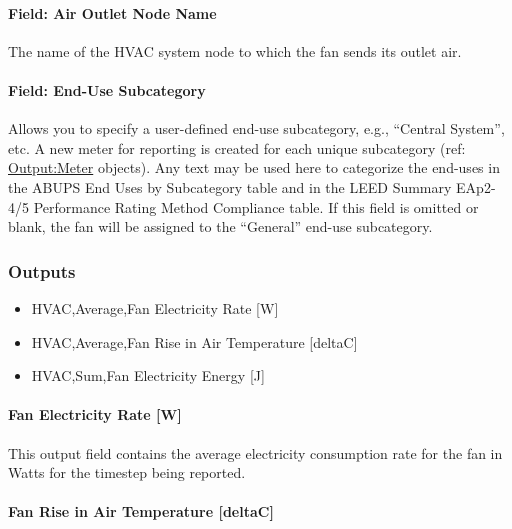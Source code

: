 \paragraph{Field: Air Outlet Node Name}\label{field-air-outlet-node-name-002}

The name of the HVAC system node to which the fan sends its outlet air.

\paragraph{Field: End-Use Subcategory}\label{field-end-use-subcategory-001}

Allows you to specify a user-defined end-use subcategory, e.g., ``Central System'', etc. A new meter for reporting is created for each unique subcategory (ref: \hyperref[outputmeter-and-outputmetermeterfileonly]{Output:Meter} objects). Any text may be used here to categorize the end-uses in the ABUPS End Uses by Subcategory table and in the LEED Summary EAp2-4/5 Performance Rating Method Compliance table. If this field is omitted or blank, the fan will be assigned to the ``General'' end-use subcategory.

\subsubsection{Outputs}\label{outputs-013}

\begin{itemize}
\item
  HVAC,Average,Fan Electricity Rate {[}W{]}
\item
  HVAC,Average,Fan Rise in Air Temperature {[}deltaC{]}
\item
  HVAC,Sum,Fan Electricity Energy {[}J{]}
\end{itemize}

\paragraph{Fan Electricity Rate {[}W{]}}\label{fan-electric-power-w}

This output field contains the average electricity consumption rate for the fan in Watts for the timestep being reported.

\paragraph{Fan Rise in Air Temperature {[}deltaC{]}}\label{fan-rise-in-air-temperature-deltac}

